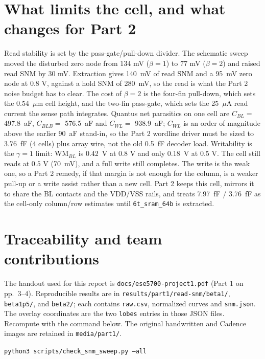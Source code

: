 \documentclass[10pt,letterpaper]{article}
\newcommand{\sourcepath}[1]{\nolinkurl{#1}}
\newcommand{\cellH}{0.54}           %
\newcommand{\cBL}{497.8}            %
\newcommand{\cBLB}{576.5}           %
\newcommand{\cWL}{938.9}            %
\newcommand{\cBLarr}{7.97}          %
\newcommand{\cWLarr}{3.76}          %
\newcommand{\snmHold}{280}          %
\newcommand{\snmReadPL}{140}        %
\newcommand{\vZeroPL}{95}           %
\newcommand{\wmBL}{0.42}            %
\newcommand{\iCell}{25}             %
\newcommand{\snmReadFive}{70}\newcommand{\wmFive}{0.18}
\begin{document}
\section{What limits the cell, and what changes for Part 2}
Read stability is set by the pass-gate/pull-down divider. The schematic sweep moved the disturbed zero node from $134$ mV ($\beta=1$) to $77$ mV ($\beta=2$) and raised read SNM by $30$ mV. Extraction gives \snmReadPL\ mV of read SNM and a \vZeroPL\ mV zero node at $0.8$ V, against a hold SNM of \snmHold\ mV, so the read is what the Part 2 noise budget has to clear. The cost of $\beta=2$ is the four-fin pull-down, which sets the \cellH\ $\mu$m cell height, and the two-fin pass-gate, which sets the \iCell\ $\mu$A read current the sense path integrates. Quantus net parasitics on one cell are $C_{BL}=$ \cBL\ aF, $C_{BLB}=$ \cBLB\ aF and $C_{WL}=$ \cWL\ aF; $C_{WL}$ is an order of magnitude above the earlier 90~aF stand-in, so the Part 2 wordline driver must be sized to \cWLarr\ fF (4 cells) plus array wire, not the old 0.5~fF decoder load. Writability is the $\gamma=1$ limit: $\mathrm{WM}_{BL}$ is \wmBL\ V at $0.8$ V and only \wmFive\ V at $0.5$ V. The cell still reads at $0.5$ V (\snmReadFive\ mV), and a full write still completes. The write is the weak one, so a Part 2 remedy, if that margin is not enough for the column, is a weaker pull-up or a write assist rather than a new cell. Part 2 keeps this cell, mirrors it to share the BL contacts and the VDD/VSS rails, and treats \cBLarr\ fF / \cWLarr\ fF as the cell-only column/row estimates until \texttt{6t\_sram\_64b} is extracted.

\section*{Traceability and team contributions}
The handout used for this report is \sourcepath{docs/ese5700-project1.pdf} (Part 1 on pp.~3--4). Reproducible results are in \sourcepath{results/part1/read-snm/beta1/}, \sourcepath{beta1p5/}, and \sourcepath{beta2/}; each contains \sourcepath{raw.csv}, normalized curves and \sourcepath{snm.json}. The overlay coordinates are the two \sourcepath{lobes} entries in those JSON files. Recompute with the command below. The original handwritten and Cadence images are retained in \sourcepath{media/part1/}.

\begin{center}\small\texttt{python3 scripts/check\_snm\_sweep.py --all}\end{center}
\end{document}
